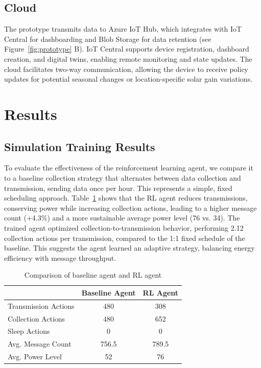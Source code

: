\documentclass[10pt]{cai}
\begin{document}
\subsection{Cloud}
The prototype transmits data to Azure IoT Hub, which integrates with IoT Central for dashboarding and Blob Storage for data retention (see Figure~\ref{fig:prototype} B). 
IoT Central supports device registration, dashboard creation, and digital twins, enabling remote monitoring and state updates.
The cloud facilitates two-way communication, allowing the device to receive policy updates for potential seasonal changes or location-specific solar gain variations.


\section{Results}

\subsection{Simulation Training Results}
To evaluate the effectiveness of the reinforcement learning agent, we compare it to a baseline collection strategy that alternates between data collection and transmission, sending data once per hour. 
This represents a simple, fixed scheduling approach.
Table~\ref{tab:agent_comparison} shows that the RL agent reduces transmissions, conserving power while increasing collection actions, leading to a higher message count (+4.3\%) and a more sustainable average power level (76 vs. 34).
The trained agent optimized collection-to-transmission behavior, performing 2.12 collection actions per transmission, compared to the 1:1 fixed schedule of the baseline. 
This suggests the agent learned an adaptive strategy, balancing energy efficiency with message throughput.


\begin{table}[h]
  \centering
  \caption{Comparison of baseline agent and RL agent}
  \begin{tabular}{lcc}
      \toprule
      & Baseline Agent & RL Agent \\
      \midrule
      Transmission Actions & 480 & 308 \\
      Collection Actions & 480 & 652 \\
      Sleep Actions & 0 & 0 \\
      Avg. Message Count & 756.5 & 789.5 \\
      Avg. Power Level & 52 & 76 \\
      \bottomrule
  \end{tabular}
  \label{tab:agent_comparison}
\end{table}
\end{document}

